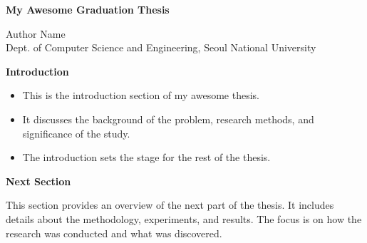 \documentclass{snucseposter}
\newcommand{\sectiontitle}[1]{
  \vspace{10pt}
  \begin{mdframed}[style=box]
    \begin{center}
      {\large \textbf{#1}}
    \end{center}
  \end{mdframed}
  \vspace{5pt}
}
\begin{document}
\printheader

\begin{center}

  \textbf{\bf\huge\color{NavyBlue} My Awesome Graduation Thesis}

  \vspace{10px}

  \Large Author Name
  \qquad {}
  \\[0.3cm]
  \large Dept. of Computer Science and Engineering, Seoul National University\\[0.3cm]

\end{center}

\begin{multicols}{2} %

  \sectiontitle{Introduction}

  \begin{itemize}
    \item This is the introduction section of my awesome thesis.
    \item It discusses the background of the problem, research methods, and significance of the study.
    \item The introduction sets the stage for the rest of the thesis.
  \end{itemize}

  \sectiontitle{Next Section}

  \vspace*{-7pt}

  This section provides an overview of the next part of the thesis. It includes details about the methodology, experiments, and results. The focus is on how the research was conducted and what was discovered.

\end{multicols}
\end{document}
